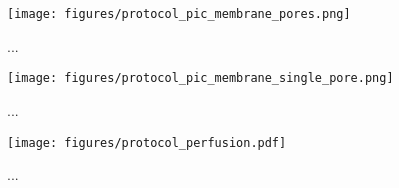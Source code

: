 \begin{figure}[h]
\begin{centering}
\texttt{[image: figures/protocol\_pic\_membrane\_pores.png]}
\caption[Diagram of nanopore introduction]{...}
\label{fig:protocol_pores}
\end{centering}
\end{figure}

\begin{figure}[h]
\begin{centering}
\texttt{[image: figures/protocol\_pic\_membrane\_single\_pore.png]}
\caption[Diagram of single nanopore capture]{...}
\label{fig:protocol_single_pore}
\end{centering}
\end{figure}

\begin{figure}[h]
\begin{centering}
\texttt{[image: figures/protocol\_perfusion.pdf]}
\caption[Setup for removing nanopores by buffer perfusion]{...}
\label{fig:protocol_perfusion}
\end{centering}
\end{figure}